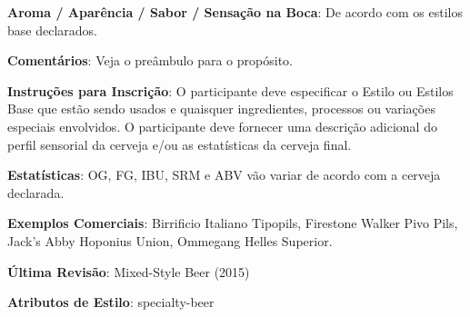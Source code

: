 \textbf{Aroma / Aparência / Sabor / Sensação na Boca}: De acordo com os estilos base declarados.

\textbf{Comentários}: Veja o preâmbulo para o propósito.

\textbf{Instruções para Inscrição}: O participante deve especificar o Estilo ou Estilos Base que estão sendo usados e quaisquer ingredientes, processos ou variações especiais envolvidos. O participante deve fornecer uma descrição adicional do perfil sensorial da cerveja e/ou as estatísticas da cerveja final.

\textbf{Estatísticas}: OG, FG, IBU, SRM e ABV vão variar de acordo com a cerveja declarada.

\textbf{Exemplos Comerciais}: Birrificio Italiano Tipopils, Firestone Walker Pivo Pils, Jack’s Abby Hoponius Union, Ommegang Helles Superior.

\textbf{Última Revisão}: Mixed-Style Beer (2015)

\textbf{Atributos de Estilo}: specialty-beer
